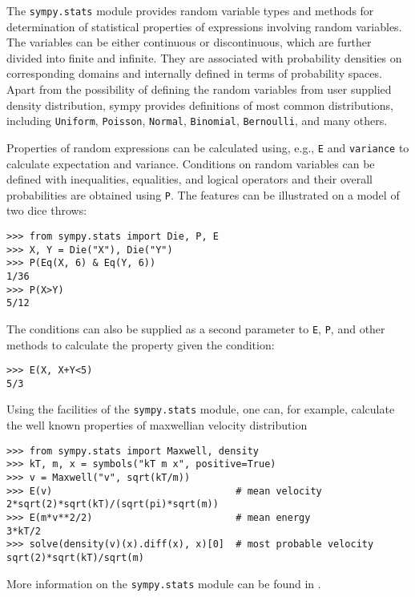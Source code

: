 The \verb|sympy.stats| module provides random variable types and methods for
determination of statistical properties of expressions involving random
variables. The variables can be either continuous or discontinuous, which are
further divided into finite and infinite. They are associated
with probability densities on corresponding domains and internally defined
in terms of probability spaces. 
Apart from the possibility of defining the random variables from user supplied
density distribution, sympy provides definitions of most common
distributions, including \texttt{Uniform}, \texttt{Poisson}, \texttt{Normal},
\texttt{Binomial}, \texttt{Bernoulli}, and many others.

Properties of random expressions can be calculated using, e.g.,
\texttt{E} and \texttt{variance} to calculate expectation and variance.
Conditions on random variables can be defined with inequalities, equalities,
and logical operators and their overall probabilities are obtained using
\texttt{P}. The features can be illustrated on a model of two dice throws:
\begin{verbatim}
>>> from sympy.stats import Die, P, E
>>> X, Y = Die("X"), Die("Y")
>>> P(Eq(X, 6) & Eq(Y, 6))
1/36
>>> P(X>Y)
5/12
\end{verbatim}
The conditions can also be supplied as a second parameter to \texttt{E},
\texttt{P}, and other methods to calculate the property given the condition:
\begin{verbatim}
>>> E(X, X+Y<5)
5/3
\end{verbatim}

Using the facilities of the \texttt{sympy.stats} module, one can, for
example, calculate 
the well known properties of maxwellian velocity distribution
\begin{verbatim}
>>> from sympy.stats import Maxwell, density
>>> kT, m, x = symbols("kT m x", positive=True)
>>> v = Maxwell("v", sqrt(kT/m))
>>> E(v)                                # mean velocity
2*sqrt(2)*sqrt(kT)/(sqrt(pi)*sqrt(m))
>>> E(m*v**2/2)                         # mean energy
3*kT/2
>>> solve(density(v)(x).diff(x), x)[0]  # most probable velocity
sqrt(2)*sqrt(kT)/sqrt(m)
\end{verbatim}

More information on the \texttt{sympy.stats} module can be found in
\cite{StatsMRocklin}.
